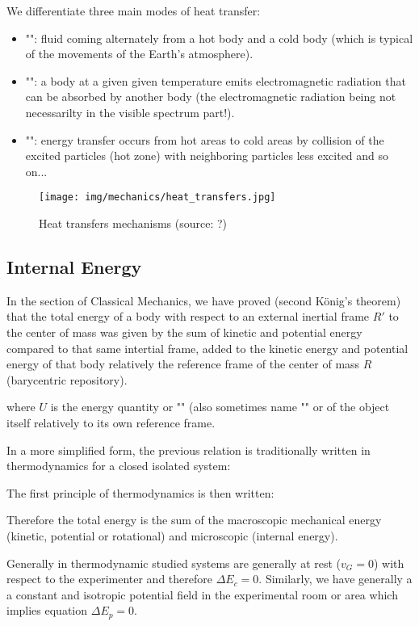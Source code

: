 	We differentiate three main modes of heat transfer:
	\begin{itemize}
		\item "": fluid coming alternately from a hot body and a cold body (which is typical of the movements of the Earth's atmosphere).

		\item "": a body at a given given temperature emits electromagnetic radiation that can be absorbed by another body (the electromagnetic radiation being not necessarilty in the visible spectrum part!).

		\item "": energy transfer occurs from hot areas to cold areas by collision of the excited particles (hot zone) with neighboring particles less excited and so on...
	\end{itemize}
	\begin{figure}[H]
		\centering
		\texttt{[image: img/mechanics/heat\_transfers.jpg]}
		\caption{Heat transfers mechanisms (source: ?)}
	\end{figure}
	\subsection{Internal Energy}
	In the section of Classical Mechanics, we have proved (second König's theorem) that the total energy of a body with respect to an external inertial frame $R'$ to the center of mass was given by the sum of kinetic and potential energy compared to that same intertial frame, added to the kinetic energy and potential energy of that body relatively the reference frame of the center of mass $R$ (barycentric repository).
	
	where $U$ is the energy quantity or "" (also sometimes name "" or of the object itself relatively to its own reference frame.

	In a more simplified form, the previous relation is traditionally written in thermodynamics for a closed isolated system:
	
	The first principle of thermodynamics is then written:
	
	Therefore the total energy is the sum of the macroscopic mechanical energy (kinetic, potential or rotational) and microscopic (internal energy).

	Generally in thermodynamic studied systems are generally at rest ($v_G=0$) with respect to the experimenter and therefore $\Delta E_c=0$. Similarly, we have generally a a constant and isotropic potential field in the experimental room or area which implies equation $\Delta E_p=0$.

